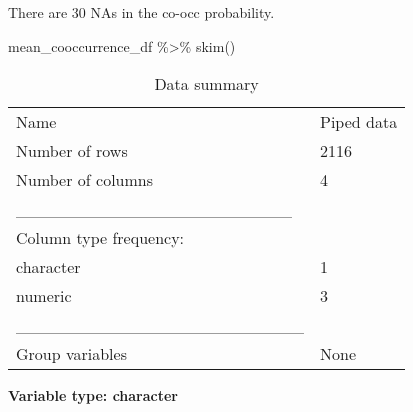 \documentclass[
  letterpaper,
  DIV=11,
  numbers=noendperiod]{scrreprt}
\newenvironment{Shaded}{\begin{snugshade}}{\end{snugshade}}
\newcommand{\FunctionTok}[1]{\textcolor[rgb]{0.28,0.35,0.67}{#1}}
\newcommand{\NormalTok}[1]{\textcolor[rgb]{0.00,0.23,0.31}{#1}}
\newcommand{\SpecialCharTok}[1]{\textcolor[rgb]{0.37,0.37,0.37}{#1}}
\begin{document}
There are 30 NAs in the co-occ probability.

\begin{Shaded}
\begin{Highlighting}[]
\NormalTok{mean\_cooccurrence\_df }\SpecialCharTok{\%\textgreater{}\%}
  \FunctionTok{skim}\NormalTok{()}
\end{Highlighting}
\end{Shaded}

\begin{longtable}[]{@{}ll@{}}
\caption{Data summary}\tabularnewline
\toprule\noalign{}
\endfirsthead
\endhead
\bottomrule\noalign{}
\endlastfoot
Name & Piped data \\
Number of rows & 2116 \\
Number of columns & 4 \\
\_\_\_\_\_\_\_\_\_\_\_\_\_\_\_\_\_\_\_\_\_\_\_ & \\
Column type frequency: & \\
character & 1 \\
numeric & 3 \\
\_\_\_\_\_\_\_\_\_\_\_\_\_\_\_\_\_\_\_\_\_\_\_\_ & \\
Group variables & None \\
\end{longtable}

\textbf{Variable type: character}
\end{document}
